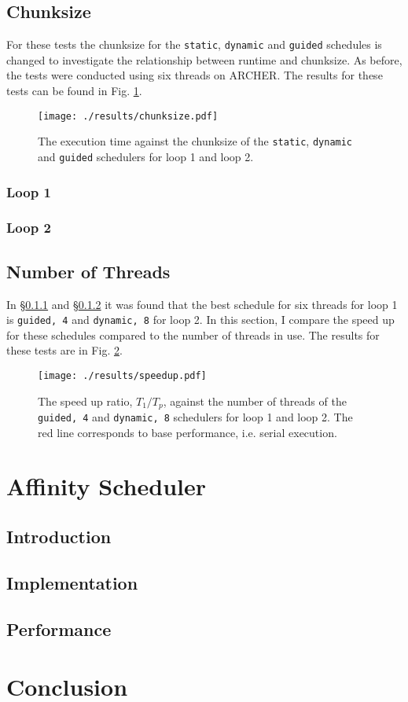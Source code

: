 \documentclass[11pt, a4paper]{article}
\begin{document}
		\subsection{Chunksize} \label{sect:chunksize}
			For these tests the chunksize for the \texttt{static}, \texttt{dynamic} and \texttt{guided} schedules is changed to investigate the relationship between runtime and chunksize. As before, the tests were conducted using six threads on ARCHER. The results for these tests can be found in Fig. \ref{fig:chunksize}. 
		
		
			\begin{figure}
				\centering
				\texttt{[image: ./results/chunksize.pdf]}
				\caption{The execution time against the chunksize of the \texttt{static}, \texttt{dynamic} and \texttt{guided} schedulers for loop 1 and loop 2.}
				\label{fig:chunksize}
			\end{figure}
			
			\subsubsection{Loop 1} \label{sect:loop1_chunks}

			\subsubsection{Loop 2} \label{sect:loop2_chunks}
			
		
		\subsection{Number of Threads}
			In \S\ref{sect:loop1_chunks} and \S\ref{sect:loop2_chunks} it was found that the best schedule for six threads for loop 1 is \texttt{guided, 4} and \texttt{dynamic, 8} for loop 2. In this section, I compare the speed up for these schedules compared to the number of threads in use. The results for these tests are in Fig. \ref{fig:n_threads}.
			
			\begin{figure}
				\centering
				\texttt{[image: ./results/speedup.pdf]}
				\caption{The speed up ratio, $T_{1}/T_{p}$, against the number of threads of the \texttt{guided, 4} and \texttt{dynamic, 8} schedulers for loop 1 and loop 2. The red line corresponds to base performance, i.e. serial execution.}
				\label{fig:n_threads}
			\end{figure}
			
	
	
	\section{Affinity Scheduler}
		\subsection{Introduction}
		
		\subsection{Implementation}
		
		\subsection{Performance}
		
	
	\section{Conclusion}
			
\end{document}
